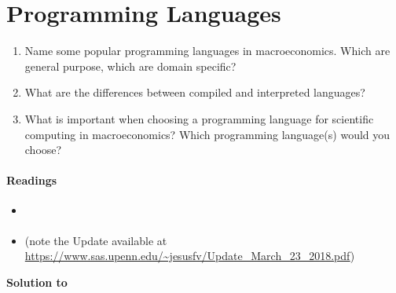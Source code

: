 \section[Programming Languages]{Programming Languages\label{ex:ProgrammingLanguages}}
\begin{enumerate}
	\item Name some popular programming languages in macroeconomics.
	Which are general purpose, which are domain specific?
	\item What are the differences between compiled and interpreted languages?
	\item What is important when choosing a programming language for scientific computing in macroeconomics?
	Which programming language{(s)} would you choose?
\end{enumerate}

\paragraph{Readings}
\begin{itemize}
\item \textcite{Aguirre.Danielsson_2020_WhichProgrammingLanguage}
\item \textcite{Aruoba.Fernandez-Villaverde_2015_ComparisonProgrammingLanguages} (note the Update available at \url{https://www.sas.upenn.edu/~jesusfv/Update_March_23_2018.pdf})
\end{itemize}

\begin{solution}\textbf{Solution to }
\ifDisplaySolutions%

\fi
\newpage
\end{solution}